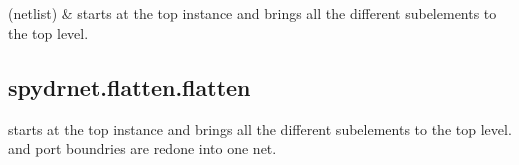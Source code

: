 \documentclass[letterpaper,10pt,english,openany,oneside]{sphinxmanual}
\begin{document}
\begin{savenotes}\sphinxatlongtablestart\begin{longtable}[c]{}
\hline

\endfirsthead

%
{}\\
\hline

\endhead

\hline
{}\\
\endfoot

\endlastfoot

{\hyperref[\detokenize{reference/classes/generated/spydrnet.flatten.flatten:spydrnet.flatten.flatten}]{}}(netlist)
&
starts at the top instance and brings all the different subelements to the top level.
\\
\hline
\end{longtable}\sphinxatlongtableend\end{savenotes}


\subsection{spydrnet.flatten.flatten}
\label{\detokenize{reference/classes/generated/spydrnet.flatten.flatten:spydrnet-flatten-flatten}}\label{\detokenize{reference/classes/generated/spydrnet.flatten.flatten::doc}}

\begin{fulllineitems}
\label{\detokenize{reference/classes/generated/spydrnet.flatten.flatten:spydrnet.flatten.flatten}}
starts at the top instance and brings all the different subelements to the top level.
and port boundries are redone into one net.

\end{fulllineitems}
\end{document}
